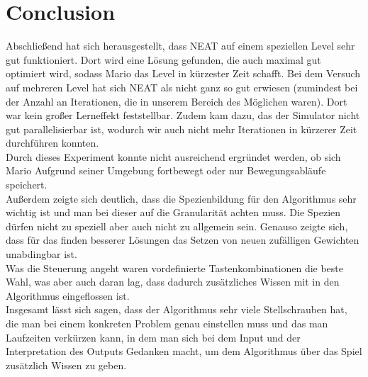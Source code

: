 \documentclass{hbrs-ecta-report}
\begin{document}
\FloatBarrier
\newpage
\section{Conclusion}
Abschließend hat sich herausgestellt, dass NEAT auf einem speziellen Level sehr gut funktioniert. Dort wird eine Lösung gefunden, die auch maximal gut optimiert wird, sodass Mario das Level in kürzester Zeit schafft. Bei dem Versuch auf mehreren Level hat sich NEAT als nicht ganz so gut erwiesen (zumindest bei der Anzahl an Iterationen, die in unserem Bereich des Möglichen waren). Dort war kein großer Lerneffekt feststellbar. Zudem kam dazu, das der Simulator nicht gut parallelisierbar ist, wodurch wir auch nicht mehr Iterationen in kürzerer Zeit durchführen konnten. \\
Durch dieses Experiment konnte nicht ausreichend ergründet werden, ob sich Mario Aufgrund seiner Umgebung fortbewegt oder nur Bewegungsabläufe speichert.\\

Außerdem zeigte sich deutlich, dass die Spezienbildung für den Algorithmus sehr wichtig ist und man bei dieser auf die Granularität achten muss. Die Spezien dürfen nicht zu speziell aber auch nicht zu allgemein sein.
Genauso zeigte sich, dass für das finden besserer Lösungen das Setzen von neuen zufälligen Gewichten unabdingbar ist.\\

Was die Steuerung angeht waren vordefinierte Tastenkombinationen die beste Wahl, was aber auch daran lag, dass dadurch zusätzliches Wissen mit in den Algorithmus eingeflossen ist.\\

Insgesamt lässt sich sagen, dass der Algorithmus sehr viele Stellschrauben hat, die man bei einem konkreten Problem genau einstellen muss und das man Laufzeiten verkürzen kann, in dem man sich bei dem Input und der Interpretation des Outputs Gedanken macht, um dem Algorithmus über das Spiel zusätzlich Wissen zu geben.


 
\end{document}

